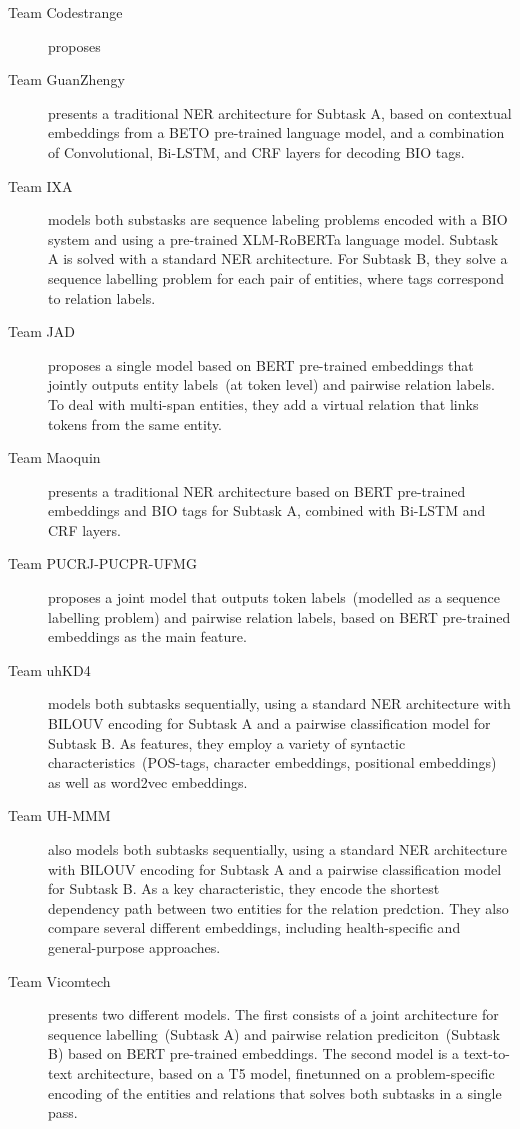 \documentclass[a4paper,11pt,twocolumn,twoside]{article}
\begin{document}
\begin{description}
  \item[Team Codestrange] proposes

  \item[Team GuanZhengy~\cite{guanzhengyi}] presents a traditional NER architecture for Subtask A, based on contextual embeddings from a BETO pre-trained language model, and a combination of Convolutional, Bi-LSTM, and CRF layers for decoding BIO tags.

  \item[Team IXA~\cite{ixa}] models both substasks are sequence labeling problems encoded with a BIO system and using a pre-trained XLM-RoBERTa language model. Subtask A is solved with a standard NER architecture. For Subtask B, they solve a sequence labelling problem for each pair of entities, where tags correspond to relation labels.

  \item[Team JAD~\cite{jad}] proposes a single model based on BERT pre-trained embeddings that jointly outputs entity labels~(at token level) and pairwise relation labels. To deal with multi-span entities, they add a virtual relation that links tokens from the same entity.

  \item[Team Maoquin~\cite{maoquin}] presents a traditional NER architecture based on BERT pre-trained embeddings and BIO tags for Subtask A, combined with Bi-LSTM and CRF layers.

  \item[Team PUCRJ-PUCPR-UFMG~\cite{pucrj}] proposes a joint model that outputs token labels~(modelled as a sequence labelling problem) and pairwise relation labels, based on BERT pre-trained embeddings as the main feature.

  \item[Team uhKD4~\cite{uhkd4}] models both subtasks sequentially, using a standard NER architecture with BILOUV encoding for Subtask A and a pairwise classification model for Subtask B. As features, they employ a variety of syntactic characteristics~(POS-tags, character embeddings, positional embeddings) as well as word2vec embeddings.

  \item[Team UH-MMM~\cite{uhmmm}] also models both subtasks sequentially, using a standard NER architecture with BILOUV encoding for Subtask A and a pairwise classification model for Subtask B. As a key characteristic, they encode the shortest dependency path between two entities for the relation predction. They also compare several different embeddings, including health-specific and general-purpose approaches.

  \item[Team Vicomtech~\cite{vicomtech}] presents two different models. The first consists of a joint architecture for sequence labelling~(Subtask A) and pairwise relation prediciton~(Subtask B) based on BERT pre-trained embeddings. The second model is a text-to-text architecture, based on a T5 model, finetunned on a problem-specific encoding of the entities and relations that solves both subtasks in a single pass.
\end{description}
\end{document}

